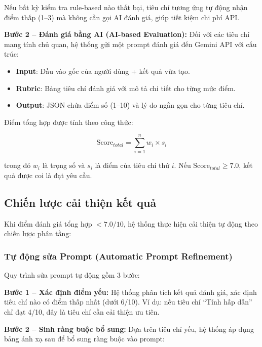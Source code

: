 Nếu bất kỳ kiểm tra rule-based nào thất bại, tiêu chí tương ứng tự động nhận điểm thấp (1--3) mà không cần gọi AI đánh giá, giúp tiết kiệm chi phí API.

\textbf{Bước 2 -- Đánh giá bằng AI (AI-based Evaluation):} Đối với các tiêu chí mang tính chủ quan, hệ thống gửi một prompt đánh giá đến Gemini API với cấu trúc:

\begin{itemize}
    \item \textbf{Input}: Đầu vào gốc của người dùng + kết quả vừa tạo.
    \item \textbf{Rubric}: Bảng tiêu chí đánh giá với mô tả chi tiết cho từng mức điểm.
    \item \textbf{Output}: JSON chứa điểm số (1--10) và lý do ngắn gọn cho từng tiêu chí.
\end{itemize}

Điểm tổng hợp được tính theo công thức:

\[
\text{Score}_{total} = \sum_{i=1}^{n} w_i \times s_i
\]

trong đó $w_i$ là trọng số và $s_i$ là điểm của tiêu chí thứ $i$. Nếu $\text{Score}_{total} \geq 7.0$, kết quả được coi là đạt yêu cầu.

\subsection{Chiến lược cải thiện kết quả}

Khi điểm đánh giá tổng hợp $< 7.0/10$, hệ thống thực hiện cải thiện tự động theo chiến lược phân tầng:

\subsubsection{Tự động sửa Prompt (Automatic Prompt Refinement)}

Quy trình sửa prompt tự động gồm 3 bước:

\textbf{Bước 1 -- Xác định điểm yếu:} Hệ thống phân tích kết quả đánh giá, xác định tiêu chí nào có điểm thấp nhất (dưới 6/10). Ví dụ: nếu tiêu chí ``Tính hấp dẫn'' chỉ đạt 4/10, đây là tiêu chí cần cải thiện ưu tiên.

\textbf{Bước 2 -- Sinh ràng buộc bổ sung:} Dựa trên tiêu chí yếu, hệ thống áp dụng bảng ánh xạ sau để bổ sung ràng buộc vào prompt:

